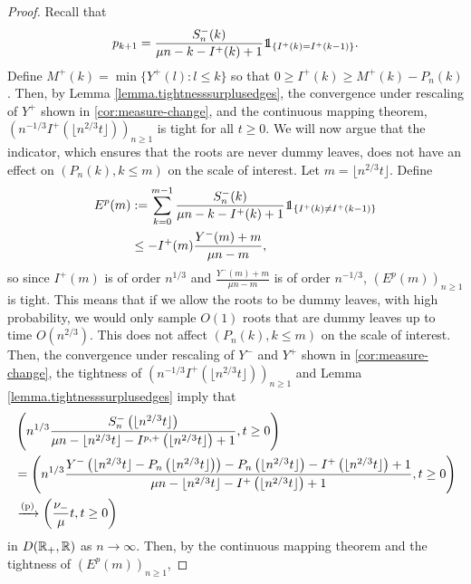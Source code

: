 \begin{proof}
Recall that
$$p_{k+1}=\frac{S_n^{-}(k)}{\mu n - k -I^{+}(k)+1}\one_{\{I^{+}(k)=I^{+}(k-1)\}}.$$
Define $M^+(k)=\min\{Y^+(l):l\leq k\}$ so that $0\geq I^{+}(k)\geq M^+(k)-P_n(k)$.  Then, by Lemma \ref{lemma.tightnesssurplusedges}, the convergence under rescaling of $Y^+$ shown in \cref{cor:measure-change}, and the continuous mapping theorem, $\left(n^{-1/3}I^+(\lfloor n^{2/3} t \rfloor)\right)_{n\geq 1}$ is tight for all $t\geq 0$.
We will now argue that the indicator, which ensures that the roots are never dummy leaves, does not have an effect on $(P_n(k),k\leq m)$ on the scale of interest. Let $m=\lfloor n^{2/3}t\rfloor$. Define
\begin{align*}\begin{split}
E^p(m)&:=\sum_{k=0}^{m-1}\frac{S_n^{-}(k)}{\mu n - k -I^{+}(k)+1}\one_{\{I^{+}(k)\neq I^{+}(k-1)\}}\\
&\leq -I^{+}(m) \frac{Y^-(m)+m}{\mu n - m},\end{split}\end{align*}
so since $I^{+}(m)$ is of order $n^{1/3}$ and $\frac{Y^{-}(m)+m}{\mu n - m}$ is of order $n^{-1/3}$, $(E^p(m))_{n\geq 1}$ is tight.  This means that if we allow the roots to be dummy leaves, with high probability, we would only sample $O(1)$ roots that are dummy leaves up to time $O(n^{2/3})$. This does not affect $(P_n(k),k\leq m)$ on the scale of interest. \\
 Then, the convergence under rescaling of $Y^-$ and $Y^+$ shown in \cref{cor:measure-change}, the tightness of $\left(n^{-1/3}I^{+}(\lfloor n^{2/3} t \rfloor)\right)_{n\geq 1}$ and Lemma \ref{lemma.tightnesssurplusedges} imply that
\begin{align}\begin{split}\label{eq.convergenceprob}
  &\left(n^{1/3}\frac{S_n^{-}\left(\lfloor n^{2/3} t \rfloor\right)}{\mu n - \lfloor n^{2/3} t \rfloor -I^{p,+}\left(\lfloor n^{2/3} t \rfloor\right)+1},t\geq 0\right)\\
 &=\left(n^{1/3}\frac{Y^-\left(\lfloor n^{2/3} t \rfloor-P_n\left(\lfloor n^{2/3} t \rfloor\right)\right)-P_n\left(\lfloor n^{2/3} t \rfloor\right)-I^{+}\left(\lfloor n^{2/3} t \rfloor\right)+1}{\mu n - \lfloor n^{2/3} t \rfloor -I^{+}\left(\lfloor n^{2/3} t \rfloor\right)+1},t\geq 0\right)\\
 &\xrightarrow[]{\mathrm{(p)}} \left(\frac{\nu_-}{\mu}t,t\geq 0\right)\end{split}\end{align}
in $D({\mathbb R}_+,{\mathbb R})$ as $n\to \infty$. 
Then, by the continuous mapping theorem and the tightness of $(E^p(m))_{n\geq 1}$,

\end{proof}
